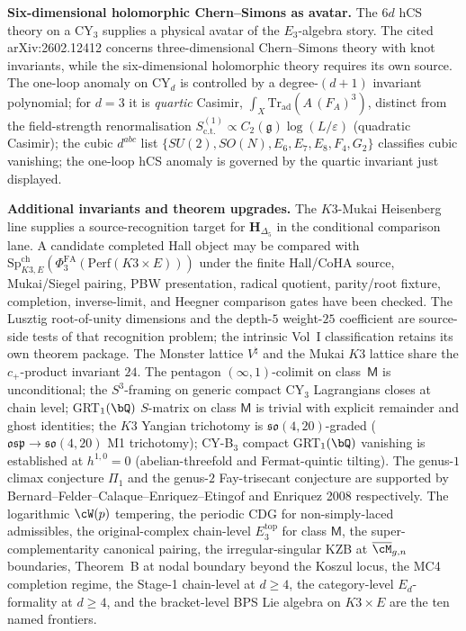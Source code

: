 \smallskip\noindent\textbf{Six-dimensional holomorphic Chern--Simons
as avatar.} The $6d$ hCS theory on a CY$_3$ supplies a physical avatar
of the $E_3$-algebra story. The cited arXiv:2602.12412 concerns
three-dimensional Chern--Simons theory with knot invariants, while the
six-dimensional holomorphic theory requires its own source. The
one-loop anomaly on CY$_d$ is
controlled by a degree-$(d+1)$ invariant polynomial; for $d=3$ it is
\emph{quartic} Casimir, $\int_X\mathrm{Tr}_{\mathrm{ad}}(A\,(F_A)^3)$,
distinct from the field-strength renormalisation
$S^{(1)}_{\mathrm{c.t.}}\propto C_2(\mathfrak g)\log(L/\varepsilon)$
(quadratic Casimir); the cubic $d^{abc}$ list
$\{SU(2),SO(N),E_6,E_7,E_8,F_4,G_2\}$ classifies cubic vanishing; the
one-loop hCS anomaly is governed by the quartic invariant just displayed.

\smallskip\noindent\textbf{Additional invariants and theorem upgrades.}
The $K3$-Mukai Heisenberg line supplies a source-recognition target for
$\mathbf H_{\Delta_5}$ in the conditional comparison lane. A candidate
completed Hall object may be compared with
$\mathrm{Sp}^{\mathrm{ch}}_{K3,E}(\Phi^{\mathrm{FA}}_3(\mathrm{Perf}(K3\times E)))$
under the finite Hall/CoHA source, Mukai/Siegel pairing,
PBW presentation, radical quotient, parity/root fixture,
completion, inverse-limit, and Heegner comparison gates have been
checked. The Lusztig root-of-unity dimensions and the depth-$5$
weight-$25$ coefficient are source-side tests of that recognition
problem; the intrinsic Vol~I classification retains its own theorem
package. The Monster
lattice $V^\natural$ and the Mukai $K3$ lattice share the
$c_+$-product invariant $24$. The pentagon $(\infty,1)$-colimit on
class~$\mathsf M$ is unconditional; the $S^3$-framing on generic
compact CY$_3$ Lagrangians closes at chain level; GRT$_1(\bQ)$
$S$-matrix on class $\mathsf M$ is trivial with explicit remainder
and ghost identities; the $K3$ Yangian trichotomy is
$\mathfrak{so}(4,20)$-graded ($\mathfrak{osp}\to\mathfrak{so}(4,20)$
M1 trichotomy); CY-B$_3$ compact GRT$_1(\bQ)$ vanishing is
established at $h^{1,0}=0$ (abelian-threefold and Fermat-quintic
tilting). The genus-$1$ climax conjecture $\Pi_1$ and the genus-$2$
Fay-trisecant conjecture are supported by Bernard--Felder--Calaque--Enriquez--Etingof
and Enriquez 2008 respectively. The logarithmic $\cW(p)$ tempering,
the periodic CDG for non-simply-laced admissibles, the
original-complex chain-level $E_3^{\mathrm{top}}$ for class $\mathsf M$,
the super-complementarity canonical pairing, the irregular-singular
KZB at $\overline{\cM}_{g,n}$ boundaries, Theorem~B at nodal
boundary beyond the Koszul locus, the MC4 completion regime, the
Stage-1 chain-level at $d\ge 4$, the category-level $E_d$-formality
at $d\ge 4$, and the bracket-level BPS Lie algebra on $K3\times E$
are the ten named frontiers.

